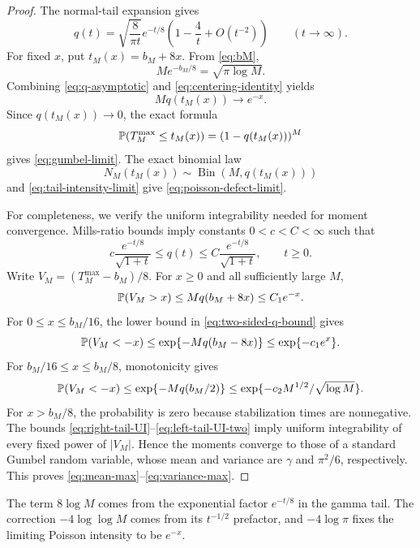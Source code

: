\begin{proof}
The normal-tail expansion gives
\begin{equation}\label{eq:q-asymptotic}
  q(t)
  =\sqrt{\frac{8}{\pi t}}e^{-t/8}
   \left(1-\frac4t+O(t^{-2})\right)
  \qquad(t\to\infty).
\end{equation}
For fixed $x$, put $t_M(x)=b_M+8x$.  From \eqref{eq:bM},
\begin{equation}\label{eq:centering-identity}
  M e^{-b_M/8}=\sqrt{\pi\log M}.
\end{equation}
Combining \eqref{eq:q-asymptotic} and \eqref{eq:centering-identity} yields
\begin{equation}\label{eq:tail-intensity-limit}
  Mq(t_M(x))\longrightarrow e^{-x}.
\end{equation}
Since $q(t_M(x))\to0$, the exact formula
\[
  \P(T_M^{\max}\le t_M(x))=(1-q(t_M(x)))^M
\]
gives \eqref{eq:gumbel-limit}.  The exact binomial law
\[
  N_M(t_M(x))\sim\operatorname{Bin}(M,q(t_M(x)))
\]
and \eqref{eq:tail-intensity-limit} give
\eqref{eq:poisson-defect-limit}.

For completeness, we verify the uniform integrability needed for moment
convergence.  Mills-ratio bounds imply constants $0<c<C<\infty$ such that
\begin{equation}\label{eq:two-sided-q-bound}
  c\frac{e^{-t/8}}{\sqrt{1+t}}
  \le q(t)\le
  C\frac{e^{-t/8}}{\sqrt{1+t}},
  \qquad t\ge0.
\end{equation}
Write $V_M=(T_M^{\max}-b_M)/8$.  For $x\ge0$ and all sufficiently large $M$,
\begin{equation}\label{eq:right-tail-UI}
  \P(V_M>x)
  \le Mq(b_M+8x)
  \le C_1e^{-x}.
\end{equation}
For $0\le x\le b_M/16$, the lower bound in
\eqref{eq:two-sided-q-bound} gives
\begin{equation}\label{eq:left-tail-UI-one}
  \P(V_M<-x)
  \le \exp\{-Mq(b_M-8x)\}
  \le \exp\{-c_1e^x\}.
\end{equation}
For $b_M/16\le x\le b_M/8$, monotonicity gives
\begin{equation}\label{eq:left-tail-UI-two}
  \P(V_M<-x)
  \le \exp\{-Mq(b_M/2)\}
  \le \exp\{-c_2M^{1/2}/\sqrt{\log M}\}.
\end{equation}
For $x>b_M/8$, the probability is zero because stabilization times are
nonnegative.  The bounds \eqref{eq:right-tail-UI}--\eqref{eq:left-tail-UI-two}
imply uniform integrability of every fixed power of $|V_M|$.  Hence the moments
converge to those of a standard Gumbel random variable, whose mean and variance
are $\gamma$ and $\pi^2/6$, respectively.  This proves
\eqref{eq:mean-max}--\eqref{eq:variance-max}.
\end{proof}

\begin{remark}\label{rem:centering}
The term $8\log M$ comes from the exponential factor $e^{-t/8}$ in the gamma
tail.  The correction $-4\log\log M$ comes from its $t^{-1/2}$ prefactor, and
$-4\log\pi$ fixes the limiting Poisson intensity to be $e^{-x}$.
\end{remark}
